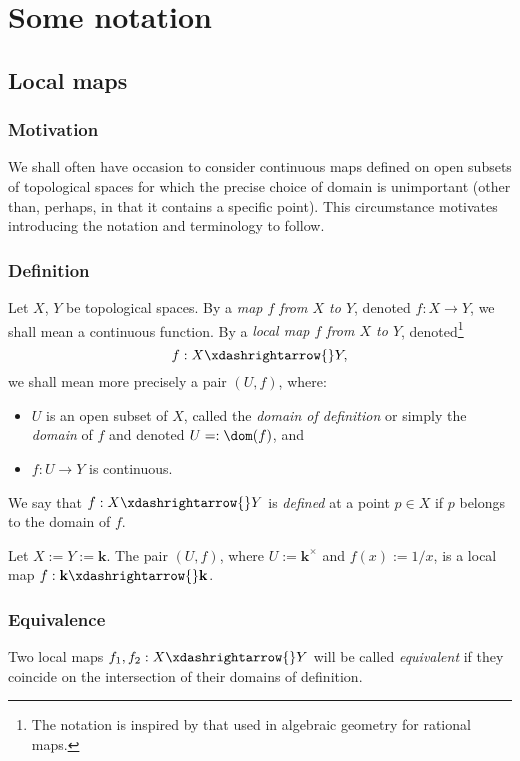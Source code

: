 \documentclass[reqno]{amsart} 
\begin{document}
\section{Some notation}
\label{sec:org8f383a2}
\subsection{Local maps\label{sec:notation-partial-functions}}
\label{sec:orgafcf8b3}
\subsubsection{Motivation}
\label{sec:org37c609c}
We shall often have occasion to consider continuous maps defined
on open subsets of topological spaces for which the precise
choice of domain is unimportant (other than, perhaps, in that it
contains a specific point).
This circumstance motivates introducing the notation
and terminology to follow.

\subsubsection{Definition}
\label{sec:org4f4ed31}
Let $X$, $Y$ be topological spaces.  
By a \emph{map $f$ from $X$ to $Y$}, denoted $f : X \rightarrow Y$, we shall mean a continuous function.
By a \emph{local map
  $f$ from $X$ to $Y$}, denoted\footnote{The notation is inspired by that used in algebraic geometry for rational maps.}  
\begin{equation*}
f : X \xdashrightarrow{} Y,
\end{equation*}
we shall mean more precisely a pair $(U,f)$, where:
\begin{itemize}
\item $U$ is an
open subset of $X$, called the \emph{domain of definition} or
simply the \emph{domain} of $f$
and denoted $U =: \dom(f)$, and
\item $f : U \rightarrow Y$ is continuous.
\end{itemize}
We say that $f : X \xdashrightarrow{} Y$ is
\emph{defined} at a point $p \in X$ if $p$
belongs to the domain of $f$.
\begin{example}
  Let $X := Y := \mathbf{k}$.
  The pair $(U,f)$,
  where $U := \mathbf{k}^\times$
  and $f(x) := 1/x$,
  is a local map
  $f : \mathbf{k} \xdashrightarrow{} \mathbf{k}$.
\end{example}

\subsubsection{Equivalence}
\label{sec:orgcfbef67}
Two local maps $f_1, f_2  : X \xdashrightarrow{} Y$
will be called \emph{equivalent}
if they coincide on the intersection of their domains of definition.
\end{document}
